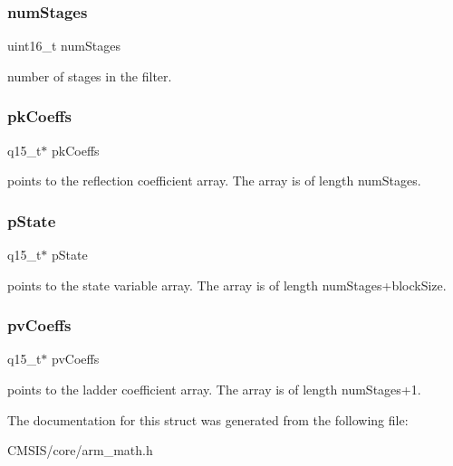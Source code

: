 \subsubsection{\texorpdfstring{num\+Stages}{numStages}}
{\footnotesize\ttfamily uint16\+\_\+t num\+Stages}

number of stages in the filter. \mbox{\label{structarm__iir__lattice__instance__q15_a12497c299b0341c18d497f8ab3465084}} 
\subsubsection{\texorpdfstring{pk\+Coeffs}{pkCoeffs}}
{\footnotesize\ttfamily q15\+\_\+t$\ast$ pk\+Coeffs}

points to the reflection coefficient array. The array is of length num\+Stages. \mbox{\label{structarm__iir__lattice__instance__q15_ae29dfdb736374fcddaeaec4b7770170c}} 
\subsubsection{\texorpdfstring{p\+State}{pState}}
{\footnotesize\ttfamily q15\+\_\+t$\ast$ p\+State}

points to the state variable array. The array is of length num\+Stages+block\+Size. \mbox{\label{structarm__iir__lattice__instance__q15_a52866ed127c7b2a8a102e2ed1a2ebab8}} 
\subsubsection{\texorpdfstring{pv\+Coeffs}{pvCoeffs}}
{\footnotesize\ttfamily q15\+\_\+t$\ast$ pv\+Coeffs}

points to the ladder coefficient array. The array is of length num\+Stages+1. 

The documentation for this struct was generated from the following file\+:\begin{DoxyCompactItemize}
\item 
C\+M\+S\+I\+S/core/arm\+\_\+math.\+h\end{DoxyCompactItemize}

